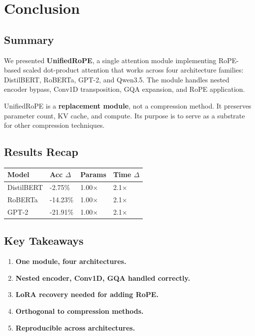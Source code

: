 
\section{Conclusion}

\subsection{Summary}

We presented \textbf{UnifiedRoPE}, a single attention module implementing RoPE-based 
scaled dot-product attention that works across four architecture families: 
DistilBERT, RoBERTa, GPT-2, and Qwen3.5. The module handles nested encoder 
bypass, Conv1D transposition, GQA expansion, and RoPE application.

UnifiedRoPE is a \textbf{replacement module}, not a compression method. It 
preserves parameter count, KV cache, and compute. Its purpose is to serve 
as a substrate for other compression techniques.

\subsection{Results Recap}

\begin{table}[H]
\centering
\small
\begin{tabular}{llll}
\toprule
\textbf{Model} & \textbf{Acc $\Delta$} & \textbf{Params} & \textbf{Time $\Delta$} \\
\midrule
DistilBERT & -2.75\% & 1.00$\times$ & 2.1$\times$ \\
RoBERTa & -14.23\% & 1.00$\times$ & 2.1$\times$ \\
GPT-2 & -21.91\% & 1.00$\times$ & 2.1$\times$ \\
\bottomrule
\end{tabular}
\end{table}

\subsection{Key Takeaways}

\begin{enumerate}
\item \textbf{One module, four architectures.}
\item \textbf{Nested encoder, Conv1D, GQA handled correctly.}
\item \textbf{LoRA recovery needed for adding RoPE.}
\item \textbf{Orthogonal to compression methods.}
\item \textbf{Reproducible across architectures.}

\end{enumerate}
